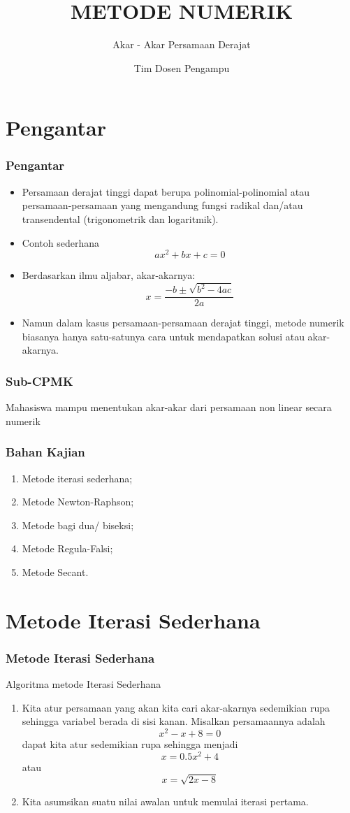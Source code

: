 \documentclass[pdflatex,compress]{beamer}
\title{METODE NUMERIK}
\subtitle{Akar - Akar Persamaan Derajat }
\author{Tim Dosen Pengampu}
\begin{document}
\maketitle

\section{Pengantar}

\begin{frame}
	\frametitle{Pengantar}
	\begin{itemize}
		\item Persamaan derajat tinggi dapat berupa polinomial-polinomial atau persamaan-persamaan yang mengandung fungsi radikal dan/atau transendental (trigonometrik dan logaritmik).
		\item Contoh sederhana
		$$ ax^2 + bx + c = 0 $$
		\item Berdasarkan ilmu aljabar, akar-akarnya:
		$$ x = \frac{-b \pm \sqrt{b^2 - 4ac}}{2a} $$
		\item Namun dalam kasus persamaan-persamaan derajat tinggi, metode numerik biasanya hanya satu-satunya cara untuk mendapatkan solusi atau akar-akarnya.
	\end{itemize}
\end{frame}

\begin{frame}
	\frametitle{Sub-CPMK}
	Mahasiswa mampu menentukan akar-akar dari persamaan non linear secara numerik
\end{frame}

\begin{frame}
	\frametitle{Bahan Kajian}
	\begin{enumerate}
		\item Metode iterasi sederhana;
		\item Metode Newton-Raphson;
		\item Metode bagi dua/ biseksi;
		\item Metode Regula-Falsi;
		\item Metode Secant.
	\end{enumerate}
\end{frame}

\section{Metode Iterasi Sederhana}

\begin{frame}
	\frametitle{Metode Iterasi Sederhana}
	Algoritma metode Iterasi Sederhana
	\begin{enumerate}
		\item Kita atur persamaan yang akan kita cari akar-akarnya sedemikian rupa sehingga variabel berada di sisi kanan. Misalkan persamaannya adalah
		$$ x^2 - x + 8 = 0 $$
		dapat kita atur sedemikian rupa sehingga menjadi
		$$ x = 0.5x^2 + 4 $$ atau $$ x = \sqrt{2x-8} $$
		\item Kita asumsikan suatu nilai awalan untuk memulai iterasi pertama.
	\end{enumerate}
\end{frame}
\end{document}
